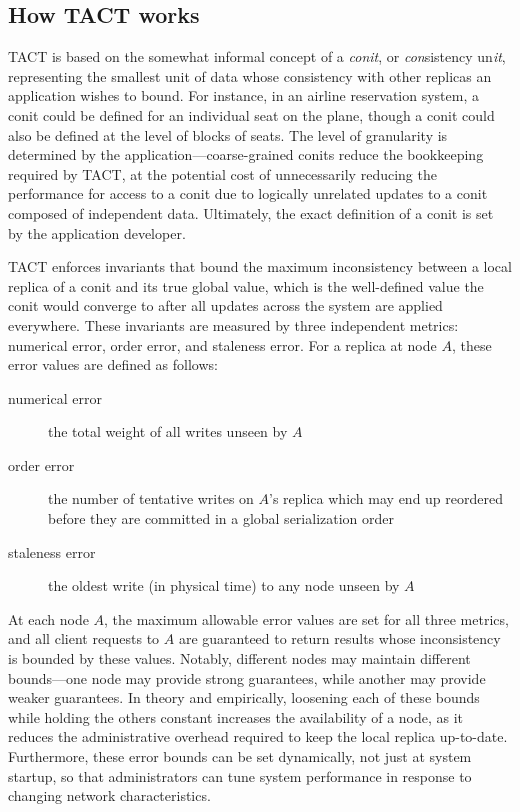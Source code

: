 \subsection{How TACT works}

TACT is based on the somewhat informal concept of a \emph{conit}, or \emph{con}sistency un\emph{it}, representing the smallest unit of data whose consistency with other replicas an application wishes to bound. For instance, in an airline reservation system, a conit could be defined for an individual seat on the plane, though a conit could also be defined at the level of blocks of seats. The level of granularity is determined by the application---coarse-grained conits reduce the bookkeeping required by TACT, at the potential cost of unnecessarily reducing the performance for access to a conit due to logically unrelated updates to a conit composed of independent data.  Ultimately, the exact definition of a conit is set by the application developer.

TACT enforces invariants that bound the maximum inconsistency between a local replica of a conit and its true global value, which is the well-defined value the conit would converge to after all updates across the system are applied everywhere. These invariants are measured by three independent metrics: numerical error, order error, and staleness error. For a replica at node $A$, these error values are defined as follows:

\begin{description}
   \item[numerical error] the total weight of all writes unseen by $A$
   \item[order error] the number of tentative writes on $A$'s replica which may end up reordered before they are committed in a global serialization order
   \item[staleness error] the oldest write (in physical time) to any node unseen by $A$
\end{description}

At each node $A$, the maximum allowable error values are set for all three metrics, and all client requests to $A$ are guaranteed to return results whose inconsistency is bounded by these values. Notably, different nodes may maintain different bounds---one node may provide strong guarantees, while another may provide weaker guarantees. In theory and empirically, loosening each of these bounds while holding the others constant increases the availability of a node, as it reduces the administrative overhead required to keep the local replica up-to-date. Furthermore, these error bounds can be set dynamically, not just at system startup, so that administrators can tune system performance in response to changing network characteristics.

